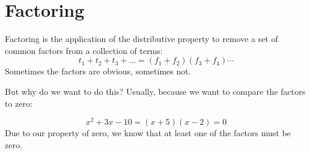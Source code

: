 \documentclass[letterpaper,12pt,fleqn]{article}
\begin{document}
\section*{Factoring}

Factoring is the application of the distributive property to remove a set of
common factors from a collection of terms:
\[t_1+t_2+t_3+\ldots=(f_1+f_2)(f_3+f_4)\cdots\]
Sometimes the factors are obvious, sometimes not.

But why do we want to do this? Usually, because we want to compare the factors
to zero:

\begin{example}
  \listbreak
  \[x^2+3x-10=(x+5)(x-2)=0\]
  Due to our property of zero, we know that at least one of the factors must be
  zero.
\end{example}
\end{document}
